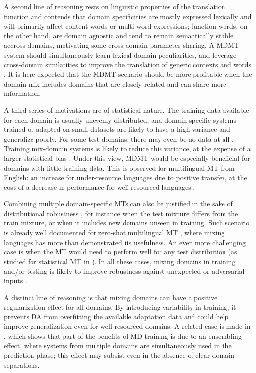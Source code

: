 \documentclass[11pt,a4paper]{article}
\begin{document}
A second line of reasoning rests on linguistic properties of the translation function and contends that domain specificities are mostly expressed lexically and will primarily affect content words or multi-word expressions; function words, on the other hand, are domain agnostic and tend to remain semantically stable accross domains, motivating some cross-domain parameter sharing. A MDMT system should simultaneously learn lexical domain peculiarities, and leverage cross-domain similarities to improve the translation of generic contexts and words \cite{Zeng18multidomain,Pham19generic}. It is here expected that the MDMT scenario should be more profitable when the domain mix includes domains that are closely related and can share more information.

A third series of motivations are of statistical nature. The training data available for each domain is usually unevenly distributed, and domain-specific systems trained or adapted on small datasets are likely to have a high variance and generalize poorly. For some test domains, there may even be no data at all \cite{Farajian17neural}. Training mix-domain systems is likely to reduce this variance, at the expense of a larger statistical bias \cite{Clark12onesystem}. Under this view, MDMT would be especially beneficial for domains with little training data. This is observed for multilingual MT from English: an increase for under-resource languages due to positive transfer, at the cost of a decrease in performance for well-resourced languages \cite{Arivazhagan19massively}.

Combining multiple domain-specific MTs can also be justified in the sake of distributional robustness \cite{Mansour09domainadaptation,Mansour09multiple}, for instance when the test mixture differs from the train mixture, or when it includes new domains unseen in training. Such scenario is already well documented for zero-shot multilingual MT \cite{Firat16multiway,Ha16towards,Johnson17google,Platanios18contextual}, where mixing languages has more than demonstrated its usefulness.  An even more challenging case is when the MT would need to perform well for any test distribution (as studied for statistical MT in \cite{Huck15mixeddomain}). In all these cases, mixing domains in training and/or testing is likely to improve robustness against unexpected or adversarial inputs \cite{Oren19distributionally}.

A distinct line of reasoning is that mixing domains can have a positive regularization effect for all domains. By introducing variability in training, it prevents DA from overfitting the available adaptation data and could help improve generalization even for well-resourced domains. A related case is made in \cite{Joshi12multidomain}, which shows that part of the benefits of MD training is due to an ensembling effect, where systems from multiple domains are simultaneously used in the prediction phase; this effect may subsist even in the absence of clear domain separations.
\end{document}
